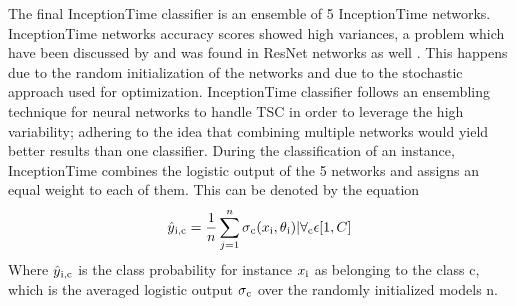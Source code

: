 The final InceptionTime classifier is an ensemble of 5 InceptionTime networks.
InceptionTime networks accuracy scores showed high variances, a problem which have been discussed by \cite{scardapane2017randomness} and was found in ResNet networks as well \cite{fawaz2019deep}.
This happens due to the random initialization of the networks and due to the stochastic approach used for optimization.
InceptionTime classifier follows an ensembling technique for neural networks to handle TSC \cite{fawaz2019deep} in order to leverage the high variability;
adhering to the idea that combining multiple networks would yield better results than one classifier.
During the classification of an instance, InceptionTime combines the logistic output of the 5 networks and assigns an equal weight to each of them.
This can be denoted by the equation
\begin{equation}
    \hat{y}\textsubscript{i,c} = \frac{1}{n} \sum_{j = 1}^{n} \sigma\textsubscript{c} (x\textsubscript{i}, \theta\textsubscript{i}) | \forall\textsubscript{c} \epsilon [1,C]
\end{equation}
Where $\hat{y}\textsubscript{i,c}$ is the class probability for instance $x\textsubscript{i}$ as belonging to the class c,
which is the averaged logistic output $\sigma\textsubscript{c}$ over the randomly initialized models n.